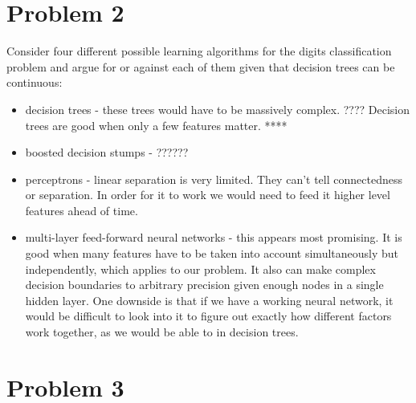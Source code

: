\documentclass{article}
\begin{document}
\section*{Problem 2}
Consider four different possible learning algorithms for the digits
classification problem and argue for or against each of them given that
decision trees can be continuous: 
\begin{itemize}
\item decision trees - 
 these trees would have to be massively complex. ????
 Decision trees are good when only a few features matter. ****
\item boosted decision stumps - ??????
\item perceptrons - linear separation is very limited. They can't tell 
connectedness or separation. In order for it to work we would need to
feed it higher level features ahead of time.  

\item multi-layer feed-forward neural networks - this appears most promising. 
  It is good when many features have to be taken into account simultaneously
  but independently, which applies to our problem. It also can make complex 
  decision boundaries to arbitrary precision given enough nodes in a single
  hidden layer. One downside is that if we have a working neural network,
  it would be difficult to look into it to figure out exactly how different
  factors work together, as we would be able to in decision trees. 
\end{itemize}

\section*{Problem 3}
\end{document}
